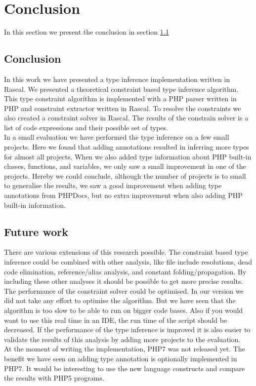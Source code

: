 \documentclass[main.tex]{subfiles}
\begin{document}
    \chapter{Conclusion}\label{ch:conclusion}
    In this section we present the conclusion in section \ref{conclusion:conclusion}
    
    \section{Conclusion}\label{conclusion:conclusion}
    In this work we have presented a type inference implementation written in Rascal.
    We presented a theoretical constraint based type inference algorithm.
    This type constraint algorithm is implemented with a PHP parser written in PHP and constraint extractor written in Rascal.
    To resolve the constraints we also created a constraint solver in Rascal.
    The results of the constrain solver is a list of code expressions and their possible set of types.
    \\
    In a small evaluation we have performed the type inference on a few small projects.
    Here we found that adding annotations resulted in inferring more types for almost all projects.
    When we also added type information about PHP built-in classes, functions, and variables, we only saw a small improvement in one of the projects.
    Hereby we could conclude, although the number of projects is to small to generalise the results, we saw a good improvement when adding type annotations from PHPDocs, but no extra improvement when also adding PHP built-in information.
    
    \section{Future work}\label{conclusion:future-work}
    There are various extensions of this research possible.
    The constraint based type inference could be combined with other analysis, like file include resolutions, dead code elimination, reference/alias analysis, and constant folding/propagation.
    By including these other analyses it should be possible to get more precise results.
    \\
    The performance of the constraint solver could be optimised.
    In our version we did not take any effort to optimise the algorithm.
    But we have seen that the algorithm is too slow to be able to run on bigger code bases.
    Also if you would want to use this real time in an IDE, the run time of the script should be decreased.
    If the performance of the type inference is improved it is also easier to validate the results of this analysis by adding more projects to the evaluation.
    \\
    At the moment of writing the implementation, PHP7 was not released yet.
    The benefit we have seen on adding type annotation is optionally implemented in PHP7.
    It would be interesting to use the new language constructs and compare the results with PHP5 programs.
    
\end{document}
